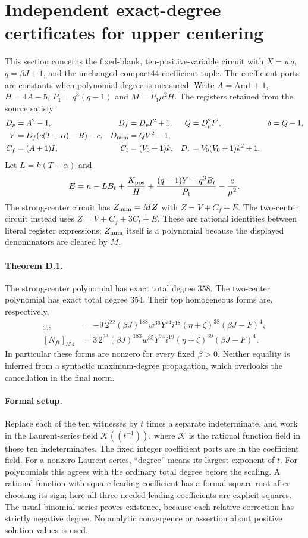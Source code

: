 \section{Independent exact-degree certificates for upper centering}
\label{sec:upper-centered-degrees}

This section concerns the fixed-blank, ten-positive-variable circuit with
$X=wq$, $q=\beta J+1$, and the unchanged compact44 coefficient tuple.
The coefficient ports are constants when polynomial degree is measured.
Write $A=\mathrm{Am1}+1$, $H=4A-5$, $P_1=q^3(q-1)$ and
$M=P_1\mu^2H$.  The registers retained from the source satisfy
\begin{align*}
 D_p&=A^2-1,&D_f&=D_p I^2+1,&Q&=D_p^2I^2,&\delta&=Q-1,\\
 V&=D_f(c(T+\alpha)-R)-c,&D_{\rm num}&=QV^2-1,\\
 C_f&=(A+1)I,&C_t&=(V_0+1)k,&
 D_\tau&=V_0(V_0+1)k^2+1.
\end{align*}
Let $L=k(T+\alpha)$ and
\[
 E=n-LB_t+\frac{K_{\rm pos}}H
   +\frac{(q-1)Y-q^3B_t}{P_1}-\frac e{\mu^2}.
\]
The strong-center circuit has $Z_{\rm num}=MZ$ with
$Z=V+C_f+E$.  The two-center circuit instead uses
$Z=V+C_f+3C_t+E$.  These are rational identities between literal
register expressions; $Z_{\rm num}$ itself is a polynomial because the
displayed denominators are cleared by $M$.

\paragraph{Theorem D.1.}
The strong-center polynomial has exact total degree $358$.  The
two-center polynomial has exact total degree $354$.  Their top
homogeneous forms are, respectively,
\begin{align*}
 [N_f]_{358}
   &=-9\,2^{22}(\beta J)^{188}w^{36}Y^{74}i^{18}
       (\eta+\zeta)^{38}(\beta J-F)^4,\\
 [N_{ft}]_{354}
   &=3\,2^{23}(\beta J)^{183}w^{35}Y^{74}i^{19}
       (\eta+\zeta)^{39}(\beta J-F)^4.
\end{align*}
In particular these forms are nonzero for every fixed $\beta>0$.
Neither equality is inferred from a syntactic maximum-degree propagation,
which overlooks the cancellation in the final norm.

\paragraph{Formal setup.}
Replace each of the ten witnesses by $t$ times a separate indeterminate,
and work in the Laurent-series field $\mathcal K((t^{-1}))$, where
$\mathcal K$ is the rational function field in those ten indeterminates.
The fixed integer coefficient ports are in the coefficient field.
For a nonzero Laurent series, ``degree'' means its largest exponent of
$t$.  For polynomials this agrees with the ordinary total degree before
the scaling.  A rational function with square leading coefficient has a
formal square root after choosing its sign; here all three needed leading
coefficients are explicit squares.  The usual binomial series proves
existence, because each relative correction has strictly negative degree.
No analytic convergence or assertion about positive solution values is
used.

